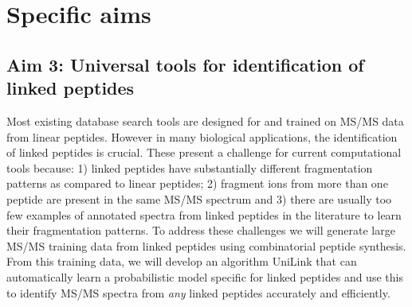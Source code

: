 \documentclass[arial,11pt]{article}
\begin{document}
\section{Specific aims}
\subsection{\textbf{Aim 3: Universal tools for identification of linked peptides}}

Most existing database search tools are designed for and trained on MS/MS data from linear peptides.  However in many biological applications, the identification of linked peptides is crucial.  These present a challenge for current computational tools because: 1) linked peptides have substantially different fragmentation patterns as compared to linear peptides; 2) fragment ions from more than one peptide are present in the same MS/MS spectrum and 3) there are usually too few examples of annotated spectra from linked peptides in the literature to learn their fragmentation patterns.  To address these challenges we will generate large MS/MS training data from linked peptides using combinatorial peptide synthesis. From this training data, we will develop an algorithm UniLink that can automatically learn a probabilistic model specific for linked peptides and use this to identify MS/MS spectra from \emph{any} linked peptides accurately and efficiently.

\end{document}
